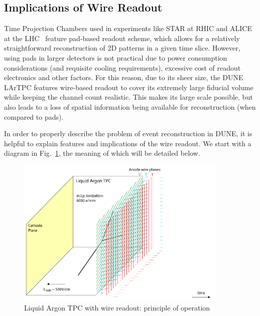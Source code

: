 \subsection{Implications of Wire Readout}
Time Projection Chambers used in experiments like STAR at RHIC and ALICE at the LHC~\cite{alice}  feature
pad-based readout scheme, which allows for a relatively straightforward reconstruction of 2D patterns in
a given time slice. However, using pads in larger detectors is not practical due to power consumption considerations
(and requisite cooling requirements), excessive cost of readout electronics and other factors. For this reason, due
to its sheer size, the DUNE LArTPC features wire-based readout to cover its extremely large fiducial volume while
keeping the channel count realistic. This makes its large scale possible, but also leads to a loss of spatial information
being available for reconstruction (when compared to pads).

In order to properly describe the problem of event reconstruction in DUNE, it is helpful to explain
features and implications of the wire readout. We start with a diagram in Fig.~\ref{fig:signal-0}, the meaning of which will be detailed below.
\label{sec:wirecell}
\begin{figure}[h!]
	\centering
	\includegraphics[width=0.9\textwidth]{signal-0.png}
	\caption{Liquid Argon TPC with wire readout: principle of operation}
	\label{fig:signal-0}
\end{figure}

